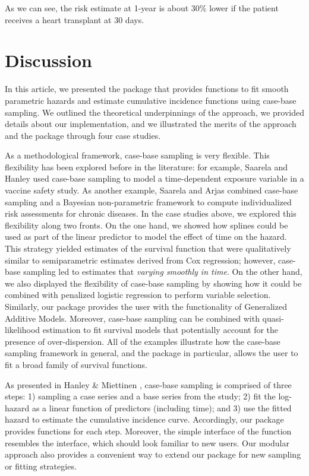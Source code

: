 \documentclass[
]{jss}
\begin{document}
As we can see, the risk estimate at 1-year is about 30\% lower if the
patient receives a heart transplant at 30 days.

\hypertarget{discussion}{%
\section{Discussion}\label{discussion}}

In this article, we presented the  package 
that provides functions to fit smooth parametric hazards and estimate
cumulative incidence functions using case-base sampling. We outlined the
theoretical underpinnings of the approach, we provided details about our
implementation, and we illustrated the merits of the approach and the
package through four case studies.

As a methodological framework, case-base sampling is very flexible. This
flexibility has been explored before in the literature: for example,
Saarela and Hanley \citeyearpar{saarela2015case} used case-base sampling
to model a time-dependent exposure variable in a vaccine safety study.
As another example, Saarela and Arjas \citeyearpar{saarela2015non}
combined case-base sampling and a Bayesian non-parametric framework to
compute individualized risk assessments for chronic diseases. In the
case studies above, we explored this flexibility along two fronts. On
the one hand, we showed how splines could be used as part of the linear
predictor to model the effect of time on the hazard. This strategy
yielded estimates of the survival function that were qualitatively
similar to semiparametric estimates derived from Cox regression;
however, case-base sampling led to estimates that \emph{varying smoothly
in time}. On the other hand, we also displayed the flexibility of
case-base sampling by showing how it could be combined with penalized
logistic regression to perform variable selection. Similarly, our
package  provides the user with the functionality of
Generalized Additive Models. Moreover, case-base sampling can be
combined with quasi-likelihood estimation to fit survival models that
potentially account for the presence of over-dispersion. All of the
examples illustrate how the case-base sampling framework in general, and
the package  in particular, allows the user to fit a broad
family of survival functions.

As presented in Hanley \& Miettinen \citeyearpar{hanley2009fitting},
case-base sampling is comprised of three steps: 1) sampling a case
series and a base series from the study; 2) fit the log-hazard as a
linear function of predictors (including time); and 3) use the fitted
hazard to estimate the cumulative incidence curve. Accordingly, our
package provides functions for each step. Moreover, the simple interface
of the  function resembles the 
interface, which should look familiar to new users. Our modular approach
also provides a convenient way to extend our package for new sampling or
fitting strategies.
\end{document}
